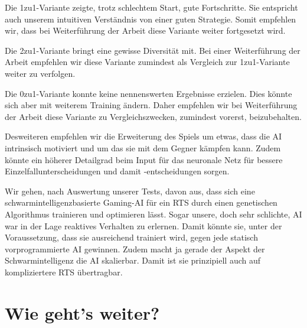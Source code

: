 \documentclass[
	12pt,
	a4paper,
	BCOR10mm,
	DIV14,
	headsepline,
	usegeometry,
]{scrreprt}
\begin{document}
Die 1zu1-Variante zeigte, trotz schlechtem Start, gute Fortschritte.
Sie entspricht auch unserem intuitiven Verständnis von einer guten Strategie.
Somit empfehlen wir, dass bei Weiterführung der Arbeit diese Variante weiter fortgesetzt wird.

Die 2zu1-Variante bringt eine gewisse Diversität mit.
Bei einer Weiterführung der Arbeit empfehlen wir diese Variante zumindest als Vergleich zur 1zu1-Variante weiter zu verfolgen.

Die 0zu1-Variante konnte keine nennenswerten Ergebnisse erzielen.
Dies könnte sich aber mit weiterem Training ändern.
Daher empfehlen wir bei Weiterführung der Arbeit diese Variante zu Vergleichszwecken, zumindest vorerst, beizubehalten.

Desweiteren empfehlen wir die Erweiterung des Spiels um etwas, dass die AI intrinsisch motiviert und um das sie mit dem Gegner kämpfen kann.
Zudem könnte ein höherer Detailgrad beim Input für das neuronale Netz für bessere Einzelfallunterscheidungen und damit -entscheidungen sorgen.

Wir gehen, nach Auswertung unserer Tests, davon aus, dass sich eine schwarmintelligenzbasierte Gaming-AI für ein RTS durch einen genetischen Algorithmus trainieren und optimieren lässt.
Sogar unsere, doch sehr schlichte, AI war in der Lage reaktives Verhalten zu erlernen.
Damit könnte sie, unter der Voraussetzung, dass sie ausreichend trainiert wird, gegen jede statisch vorprogrammierte AI gewinnen.
Zudem macht ja gerade der Aspekt der Schwarmintelligenz die AI skalierbar.
Damit ist sie prinzipiell auch auf kompliziertere RTS übertragbar.



\section{Wie geht's weiter?}
\end{document}
